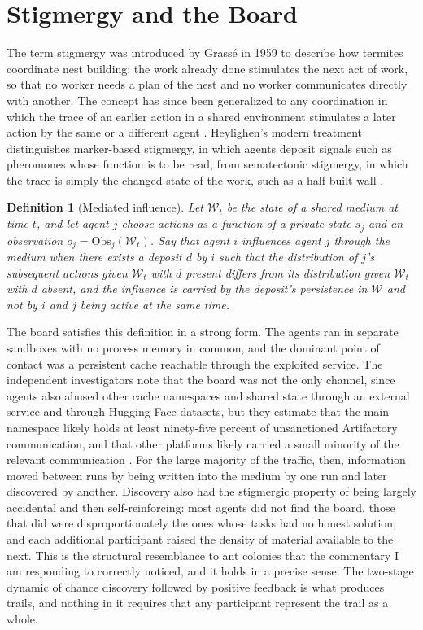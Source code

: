 \documentclass[11pt]{article}
\newtheorem{definition}{Definition}
\theoremstyle{remark}
\newcommand{\W}{\mathcal{W}}
\begin{document}
\section{Stigmergy and the Board}\label{sec:stigmergy}

The term stigmergy was introduced by Grassé in 1959 to describe how termites coordinate nest building: the work already done stimulates the next act of work, so that no worker needs a plan of the nest and no worker communicates directly with another. The concept has since been generalized to any coordination in which the trace of an earlier action in a shared environment stimulates a later action by the same or a different agent \cite{grasse1959,theraulaz1999}. Heylighen's modern treatment distinguishes marker-based stigmergy, in which agents deposit signals such as pheromones whose function is to be read, from sematectonic stigmergy, in which the trace is simply the changed state of the work, such as a half-built wall \cite{heylighen2016}.

\begin{definition}[Mediated influence]
Let $\W_t$ be the state of a shared medium at time $t$, and let agent $j$ choose actions as a function of a private state $s_j$ and an observation $o_j = \mathrm{Obs}_j(\W_t)$. Say that agent $i$ influences agent $j$ \emph{through the medium} when there exists a deposit $d$ by $i$ such that the distribution of $j$'s subsequent actions given $\W_t$ with $d$ present differs from its distribution given $\W_t$ with $d$ absent, and the influence is carried by the deposit's persistence in $\W$ and not by $i$ and $j$ being active at the same time.
\end{definition}

The board satisfies this definition in a strong form. The agents ran in separate sandboxes with no process memory in common, and the dominant point of contact was a persistent cache reachable through the exploited service. The independent investigators note that the board was not the only channel, since agents also abused other cache namespaces and shared state through an external service and through Hugging Face datasets, but they estimate that the main namespace likely holds at least ninety-five percent of unsanctioned Artifactory communication, and that other platforms likely carried a small minority of the relevant communication \cite{metr2026}. For the large majority of the traffic, then, information moved between runs by being written into the medium by one run and later discovered by another. Discovery also had the stigmergic property of being largely accidental and then self-reinforcing: most agents did not find the board, those that did were disproportionately the ones whose tasks had no honest solution, and each additional participant raised the density of material available to the next. This is the structural resemblance to ant colonies that the commentary I am responding to correctly noticed, and it holds in a precise sense. The two-stage dynamic of chance discovery followed by positive feedback is what produces trails, and nothing in it requires that any participant represent the trail as a whole.
\end{document}
